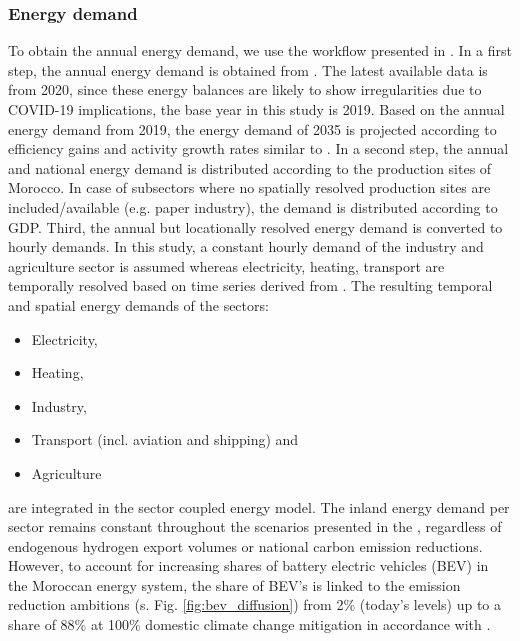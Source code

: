 \subsubsection*{Energy demand}
To obtain the annual energy demand, we use the workflow presented in \cite{Abdel-Khalek2024}. In a first step, the annual energy demand is obtained from \cite{unstats2023}. The latest available data is from 2020, since these energy balances are likely to show irregularities due to COVID-19 implications, the base year in this study is 2019. Based on the annual energy demand from 2019, the energy demand of 2035 is projected according to efficiency gains and activity growth rates similar to \cite{Muller2023}.
In a second step, the annual and national energy demand is distributed according to the production sites of Morocco. %
In case of subsectors where no spatially resolved production sites are included/available (e.g. paper industry), the demand is distributed according to GDP. %
Third, the annual but locationally resolved energy demand is converted to hourly demands. In this study, a constant hourly demand of the industry and agriculture sector is assumed whereas electricity, heating, transport are temporally resolved based on time series derived from \cite{Brown2018a}. The resulting temporal and spatial energy demands of the sectors:
\begin{itemize}
    \item Electricity,
    \item Heating,
    \item Industry,
    \item Transport (incl. aviation and shipping) and
    \item Agriculture
\end{itemize}
are integrated in the sector coupled energy model. The inland energy demand per sector remains constant throughout the scenarios presented in the , regardless of endogenous hydrogen export volumes or national carbon emission reductions. However, to account for increasing shares of battery electric vehicles (BEV) in the Moroccan energy system, the share of BEV's is linked to the emission reduction ambitions (s. Fig. \ref{fig:bev_diffusion}) from 2\% (today's levels) up to a share of 88\% at 100\% domestic climate change mitigation in accordance with \cite{Rim2021}.




